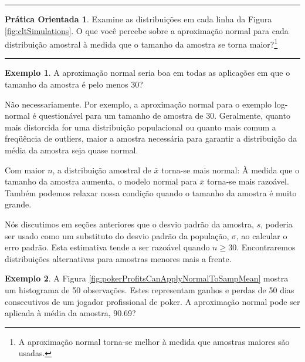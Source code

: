 \documentclass[
]{book}
\theoremstyle{definition}
\theoremstyle{definition}
\newtheorem{example}{Exemplo}[chapter]
\theoremstyle{definition}
\newtheorem{exercise}{Prática Orientada}[chapter]
\theoremstyle{definition}
\theoremstyle{remark}
\begin{document}
\begin{center}\rule{0.5\linewidth}{0.5pt}\end{center}

\begin{exercise}
\protect\hypertarget{exr:unnamed-chunk-177}{}{\label{exr:unnamed-chunk-177} }Examine as distribuições em cada linha da Figura \ref{fig:cltSimulations}. O que você percebe sobre a aproximação normal para cada distribuição amostral à medida que o tamanho da amostra se torna maior?\footnote{A aproximação normal torna-se melhor à medida que amostras maiores são usadas.}
\end{exercise}

\begin{center}\rule{0.5\linewidth}{0.5pt}\end{center}

\begin{example}
\protect\hypertarget{exm:unnamed-chunk-178}{}{\label{exm:unnamed-chunk-178} }A aproximação normal seria boa em todas as aplicações em que o tamanho da amostra é pelo menos 30?
\end{example}

Não necessariamente. Por exemplo, a aproximação normal para o exemplo log-normal é questionável para um tamanho de amostra de 30. Geralmente, quanto mais distorcida for uma distribuição populacional ou quanto mais comum a freqüência de outliers, maior a amostra necessária para garantir a distribuição da média da amostra seja quase normal.

Com maior \(n\), a distribuição amostral de \(\bar{x}\) torna-se mais normal: À medida que o tamanho da amostra aumenta, o modelo normal para \(\bar{x}\) torna-se mais razoável. Também podemos relaxar nossa condição quando o tamanho da amostra é muito grande.

Nós discutimos em seções anteriores que o desvio padrão da amostra, \(s\), poderia ser usado como um substituto do desvio padrão da população, \(\sigma\), ao calcular o erro padrão. Esta estimativa tende a ser razoável quando \(n\geq30\). Encontraremos distribuições alternativas para amostras menores mais a frente.

\begin{example}
\protect\hypertarget{exm:unnamed-chunk-179}{}{\label{exm:unnamed-chunk-179} }A Figura \ref{fig:pokerProfitsCanApplyNormalToSampMean} mostra um histograma de 50 observações. Estes representam ganhos e perdas de 50 dias consecutivos de um jogador profissional de poker. A aproximação normal pode ser aplicada à média da amostra, 90.69?
\end{example}
\end{document}
